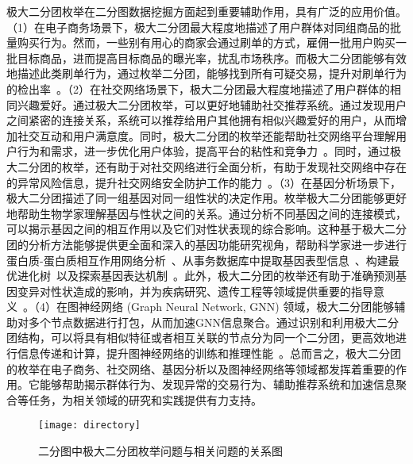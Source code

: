 极大二分团枚举在二分图数据挖掘方面起到重要辅助作用，具有广泛的应用价值。（1）在电子商务场景下，极大二分团最大程度地描述了用户群体对同组商品的批量购买行为。然而，一些别有用心的商家会通过刷单的方式，雇佣一批用户购买一批目标商品，进而提高目标商品的曝光率，扰乱市场秩序。而极大二分团能够有效地描述此类刷单行为，通过枚举二分团，能够找到所有可疑交易，提升对刷单行为的检出率~\cite{clickfarm21,MEB20,MEB22}。（2）在社交网络场景下，极大二分团最大程度地描述了用户群体的相同兴趣爱好。通过极大二分团枚举，可以更好地辅助社交推荐系统。通过发现用户之间紧密的连接关系，系统可以推荐给用户其他拥有相似兴趣爱好的用户，从而增加社交互动和用户满意度。同时，极大二分团的枚举还能帮助社交网络平台理解用户行为和需求，进一步优化用户体验，提高平台的粘性和竞争力~\cite{minel06}。同时，通过极大二分团的枚举，还有助于对社交网络进行全面分析，有助于发现社交网络中存在的异常风险信息，提升社交网络安全防护工作的能力~\cite{dangerous19,dangerous05}。（3）在基因分析场景下，极大二分团描述了同一组基因对同一组性状的决定作用。枚举极大二分团能够更好地帮助生物学家理解基因与性状之间的关系。通过分析不同基因之间的连接模式，可以揭示基因之间的相互作用以及它们对性状表现的综合影响。这种基于极大二分团的分析方法能够提供更全面和深入的基因功能研究视角，帮助科学家进一步进行蛋白质-蛋白质相互作用网络分析~\cite{protein11}、从事务数据库中提取基因表型信息~\cite{gene11}、构建最优进化树~\cite{tree04}以及探索基因表达机制~\cite{geneexp11}。此外，极大二分团的枚举还有助于准确预测基因变异对性状造成的影响，并为疾病研究、遗传工程等领域提供重要的指导意义~\cite{gene22,iMBEA14,protein21}。（4）在图神经网络 (Graph Neural Network, GNN) 领域，极大二分团能够辅助对多个节点数据进行打包，从而加速GNN信息聚合。通过识别和利用极大二分团结构，可以将具有相似特征或者相互关联的节点分为同一个二分团，更高效地进行信息传递和计算，提升图神经网络的训练和推理性能~\cite{PQ21}。总而言之，极大二分团的枚举在电子商务、社交网络、基因分析以及图神经网络等领域都发挥着重要的作用。它能够帮助揭示群体行为、发现异常的交易行为、辅助推荐系统和加速信息聚合等任务，为相关领域的研究和实践提供有力支持。

\begin{figure} [t]
  \centering
  \vspace{0.1in}
  \texttt{[image: directory]}
  \vspace{0.1in}
  \caption{二分图中极大二分团枚举问题与相关问题的关系图}
  \label{fig:directory}
\end{figure}

